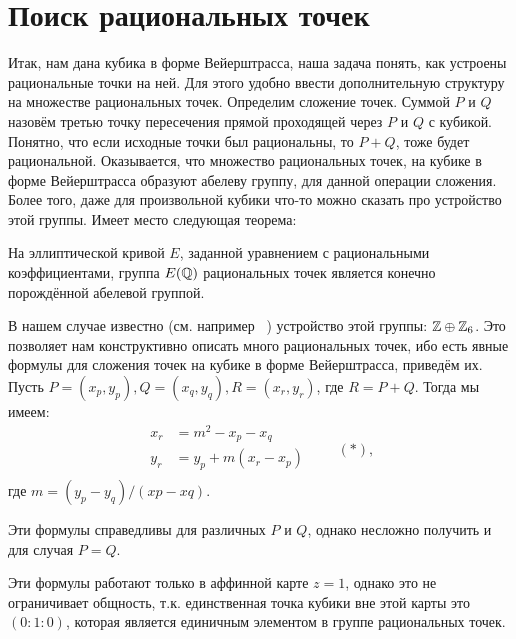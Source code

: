 \section*{Поиск рациональных точек}


Итак, нам дана кубика в форме Вейерштрасса, наша задача понять, как устроены
рациональные точки на ней. Для этого удобно ввести дополнительную структуру на
множестве рациональных точек. Определим сложение точек.  Суммой \(P\) и \(Q\)
назовём третью точку пересечения прямой проходящей через \(P\) и \(Q\) с
кубикой. Понятно, что если исходные точки был рациональны, то \(P + Q\), тоже
будет рациональной.  Оказывается, что множество рациональных точек, на кубике
в форме Вейерштрасса образуют абелеву группу, для данной операции сложения.
Более того, даже для произвольной кубики что-то можно сказать про устройство
этой группы. Имеет место следующая теорема:

\begin{theoremf}
    На эллиптической кривой \(E\), заданной уравнением с рациональными
    коэффициентами, группа \(E(\mathbb{Q})\) рациональных точек является
    конечно порождённой абелевой группой.
\end{theoremf}

В нашем случае известно (см. например ~\cite{unus_rep_prob}) устройство этой группы:
\(\mathbb{Z} \oplus \mathbb{Z}_6\). Это позволяет нам конструктивно описать много
рациональных точек, ибо есть явные формулы для сложения точек на кубике в форме
Вейерштрасса, приведём их. Пусть \(P = (x_{p}, y_{p}), Q = (x_{q}, y_{q}), R =
(x_{r}, y_{r})\), где \(R = P + Q\). Тогда мы имеем:
\[
\begin{aligned}
    x_r &= m^2 - x_p - x_q \\
    y_r &= y_p + m(x_r - x_p) \\
\end{aligned} \qquad (*)
,\] 
где \(m = (y_{p} - y_{q}) / (x{p} - x{q})\).


\begin{remark}
    Эти формулы справедливы для различных \(P\) и \(Q\), однако несложно получить и
    для случая \(P = Q\).
\end{remark}

\begin{remark}
    Эти формулы работают только в аффинной карте \(z = 1\), однако это не
    ограничивает общность, т.к. единственная точка кубики вне этой карты это
    \((0 : 1 : 0)\), которая является единичным элементом в группе рациональных точек. 
\end{remark}

